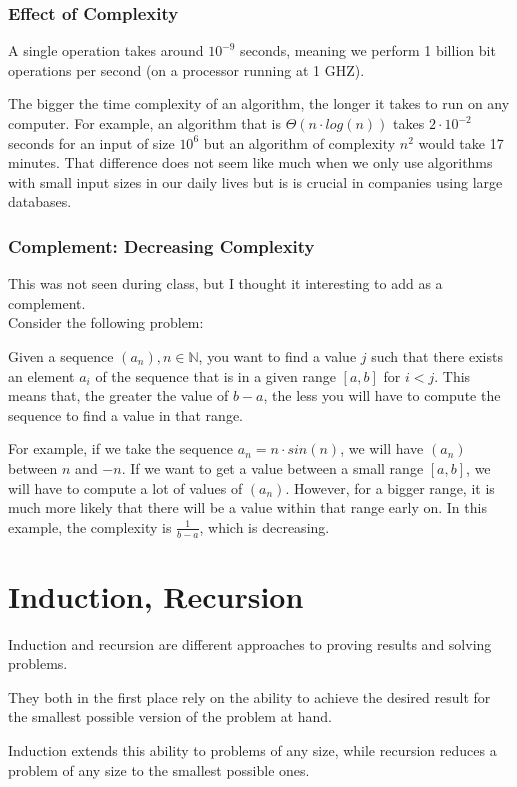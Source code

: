 \documentclass[10pt,a4paper]{book}
\newcommand{\N}{\mathbb{N}}
\begin{document}
\subsection{Effect of Complexity}
A single operation takes around $10^{-9}$ seconds, meaning we perform 1 billion bit operations per second (on a processor running at 1 GHZ).\par 
The bigger the time complexity of an algorithm, the longer it takes to run on any computer. For example, an algorithm that is $\Theta (n\cdot log(n))$ takes $2\cdot 10^{-2}$ seconds for an input of size $10^6$ but an algorithm of complexity $n^2$ would take 17 minutes. That difference does not seem like much when we only use algorithms with small input sizes in our daily lives but is is crucial in companies using large databases.
\subsection{Complement: Decreasing Complexity}
This was not seen during class, but I thought it interesting to add as a complement. \\
Consider the following problem: \par 
Given a sequence $(a_n),n\in\N$, you want to find a value $j$ such that there exists an element $a_i$ of the sequence that is in a given range $[a,b]$ for $i<j$. This means that, the greater the value of $b-a$, the less you will have to compute the sequence to find a value in that range.\par 
For example, if we take the sequence $a_n = n\cdot sin(n)$, we will have $(a_n)$ between $n$ and $-n$. If we want to get a value between a small range $[a,b]$, we will have to compute a lot of values of $(a_n)$. However, for a bigger range, it is much more likely that there will be a value within that range early on. In this example, the complexity is $\frac{1}{b-a}$, which is decreasing.

\chapter{Induction, Recursion}
Induction and recursion are different approaches to proving 
results and solving problems.\par
They both in the first place rely on the ability to achieve the 
desired result for the smallest possible version of the problem 
at hand.\par
Induction extends this ability to problems of any size, while recursion reduces a problem of any size to the smallest 
possible ones.
\end{document}
